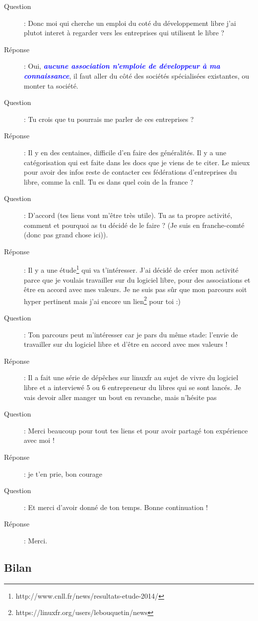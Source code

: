 \documentclass[a4paper,12pt, draft]{report}
\newcommand{\importantPoint}[1]{\textcolor{blue}{\textbf{\textit{#1}}}}
\begin{document}
\begin{description}
\item [Question]:  Donc moi qui cherche un emploi du coté du développement libre j'ai plutot interet à regarder vers les entreprises qui utilisent le libre ?
\item [Réponse]:  Oui, \importantPoint{aucune association n'emploie de développeur à ma connaissance}, il faut aller du côté des sociétés spécialisées existantes, ou monter ta société.
\item [Question]:  Tu crois que tu pourrais me parler de ces entreprises ?
\item [Réponse]:  Il y en des centaines, difficile d'en faire des généralités. Il y a une catégorisation qui est faite dans les docs que je viens de te citer. Le mieux pour avoir des infos reste de contacter ces fédérations d'entreprises du libre, comme la cnll. Tu es dans quel coin de la france ?
\item [Question]:  D'accord (tes liens vont m'être très utile). Tu as ta propre activité, comment et  pourquoi as tu décidé de le faire ? (Je suis en franche-comté (donc pas grand chose ici)).
\item [Réponse]:  Il y a une étude\footnote{http://www.cnll.fr/news/resultats-etude-2014/} qui va t'intéresser. J'ai décidé de créer mon activité parce que je voulais travailler sur du logiciel libre, pour des associations et être en accord avec mes valeurs. Je ne suis pas sûr que mon parcours soit hyper pertinent mais j'ai encore un lien\footnote{https://linuxfr.org/users/lebouquetin/news} pour toi :)
\item [Question]:  Ton parcours peut m'intéresser car je pars du même stade: l'envie de travailler sur du logiciel libre et d'être en accord avec mes valeurs !
\item [Réponse]:  Il a fait une série de dépêches sur linuxfr au sujet de vivre du logiciel libre et a interviewé 5 ou 6 entrepreneur du libres qui se sont lancés. Je vais devoir aller manger un bout en revanche, mais n'hésite pas
\item [Question]:  Merci beaucoup pour tout tes liens et pour avoir partagé ton expérience avec moi !
\item [Réponse]:  je t'en prie, bon courage
\item [Question]:  Et merci d'avoir donné de ton temps. Bonne continuation !
\item [Réponse]:  Merci.
\end{description}
\newpage
\subsection{Bilan}
\end{document}
